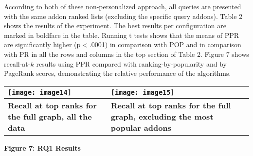 \documentclass{article} %
\begin{document}
According to both of these non-personalized approach, all queries are presented with the same addon ranked lists (excluding the specific query addons). Table 2 shows the results of the experiment. The best results per configuration are marked in boldface in the table. Running t tests shows that the means of PPR are significantly higher (p$<$.0001) in comparison with POP and in comparison with PR in all the rows and columns in the top section of Table 2. Figure 7 shows recall-at-$k$ results using PPR compared with ranking-by-popularity and by PageRank scores, demonstrating the relative performance of the algorithms.



\begin{tabular}{|p{2.2in}|p{2.2in}|} \hline 
\texttt{[image: image14]} & \texttt{[image: image15]} \\ \hline 
\textbf{Recall at top ranks for the full graph, all the data} & \textbf{Recall at top ranks for the full graph, excluding the most popular addons} \\ \hline 
\end{tabular}

\textbf{}

\noindent \textbf{Figure 7: RQ1 Results }

    

\noindent 

 
\end{document}
